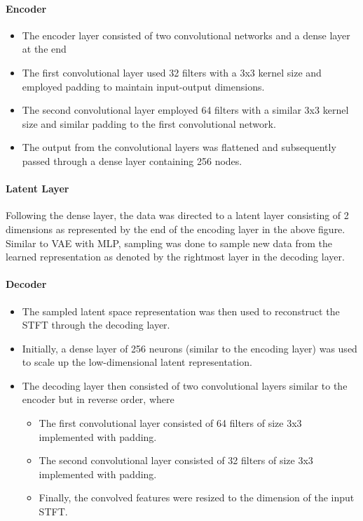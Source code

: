 \documentclass[12pt]{article}
\begin{document}
\paragraph{Encoder}
\begin{itemize}
    \item The encoder layer consisted of two convolutional networks and a dense layer at the end
    \item The first convolutional layer used 32 filters with a 3x3 kernel size and employed padding to maintain input-output dimensions.
    \item The second convolutional layer employed 64 filters with a similar 3x3 kernel size and similar padding to the first convolutional network.
    \item The output from the convolutional layers was flattened and subsequently passed through a dense layer containing 256 nodes.
\end{itemize}

\paragraph{Latent Layer}
Following the dense layer, the data was directed to a latent layer consisting of 2 dimensions as represented by the end of the encoding layer in the above figure. Similar to VAE with MLP, sampling was done to sample new data from the learned representation as denoted by the rightmost layer in the decoding layer.

\paragraph{Decoder}
\begin{itemize}
    \item The sampled latent space representation was then used to reconstruct the STFT through the decoding layer.
    \item Initially, a dense layer of 256 neurons (similar to the encoding layer) was used to scale up the low-dimensional latent representation.
    \item The decoding layer then consisted of two convolutional layers similar to the encoder but in reverse order, where
\begin{itemize}
        \item The first convolutional layer consisted of 64 filters of size 3x3 implemented with padding.
        \item The second convolutional layer consisted of 32 filters of size 3x3 implemented with padding.
        \item Finally, the convolved features were resized to the dimension of the input STFT.
\end{itemize}
\end{itemize}
\end{document}
